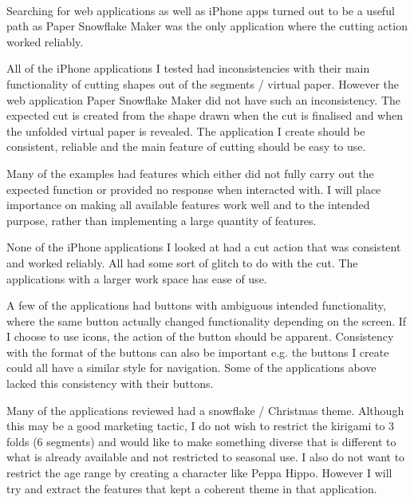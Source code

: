 \documentclass[11pt]{article}
\begin{document}
            \paragraph{}
            Searching for web applications as well as iPhone apps turned out to be a useful path as Paper Snowflake Maker was the only application where the cutting action worked reliably.
            
            All of the iPhone applications I tested had inconsistencies with their main functionality of cutting shapes out of the segments / virtual paper. However the web application Paper Snowflake Maker did not have such an inconsistency. The expected cut is created from the shape drawn when the cut is finalised and when the unfolded virtual paper is revealed. The application I create should be consistent, reliable and the main feature of cutting should be easy to use.  
            
            Many of the examples had features which either did not fully carry out the expected function or provided no response when interacted with. I will place importance on making all available features work well and to the intended purpose, rather than implementing a large quantity of features. 
            
            None of the iPhone applications I looked at had a cut action that was consistent and worked reliably. All had some sort of glitch to do with the cut. The applications with a larger work space has ease of use. 
            
            A few of the applications had buttons with ambiguous intended functionality, where the same button actually changed functionality depending on the screen. If I choose to use icons, the action of the button should be apparent. Consistency with the format of the buttons can also be important e.g. the buttons I create could all have a similar style for navigation. Some of the applications above lacked this consistency with their buttons. 
            
            Many of the applications reviewed had a snowflake / Christmas theme. Although this may be a good marketing tactic, I do not wish to restrict the kirigami to 3 folds (6 segments) and would like to make something diverse that is different to what is already available and not restricted to seasonal use. I also do not want to restrict the age range by creating a character like Peppa Hippo. However I will try and extract the features that kept a coherent theme in that application.
            
\end{document}
